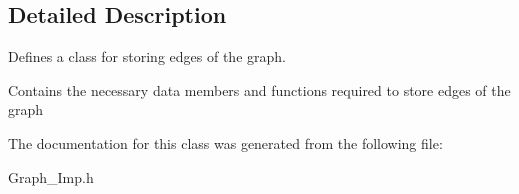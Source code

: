 \subsection{Detailed Description}
Defines a class for storing edges of the graph. 

Contains the necessary data members and functions required to store edges of the graph 

The documentation for this class was generated from the following file\+:\begin{DoxyCompactItemize}
\item 
Graph\+\_\+\+Imp.\+h\end{DoxyCompactItemize}
